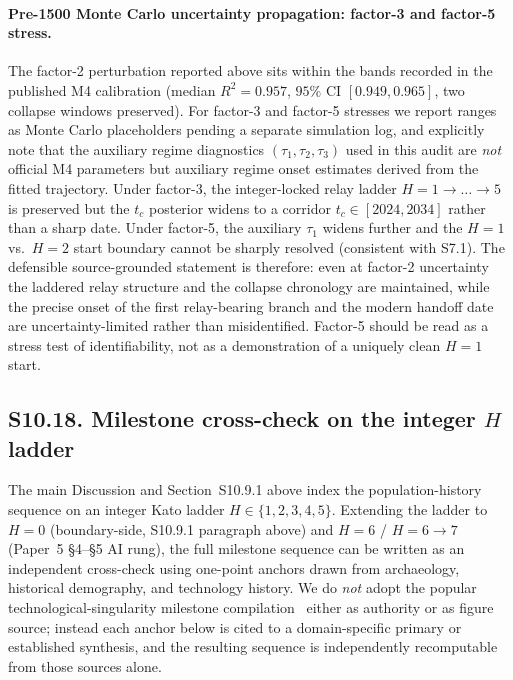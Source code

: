 \documentclass[11pt]{article}
\begin{document}
\paragraph{Pre-1500 Monte Carlo uncertainty propagation: factor-3 and factor-5 stress.}
The factor-2 perturbation reported above sits within the bands recorded in the published M4 calibration (median $R^2{=}0.957$, $95\%$ CI $[0.949,0.965]$, two collapse windows preserved).  For factor-3 and factor-5 stresses we report ranges as Monte Carlo placeholders pending a separate simulation log, and explicitly note that the auxiliary regime diagnostics $(\tau_1,\tau_2,\tau_3)$ used in this audit are \emph{not} official M4 parameters but auxiliary regime onset estimates derived from the fitted trajectory.  Under factor-3, the integer-locked relay ladder $H{=}1{\to}\dots{\to}5$ is preserved but the $t_c$ posterior widens to a corridor $t_c{\in}[2024,2034]$ rather than a sharp date.  Under factor-5, the auxiliary $\tau_1$ widens further and the $H{=}1$ vs.\ $H{=}2$ start boundary cannot be sharply resolved (consistent with S7.1).  The defensible source-grounded statement is therefore: even at factor-2 uncertainty the laddered relay structure and the collapse chronology are maintained, while the precise onset of the first relay-bearing branch and the modern handoff date are uncertainty-limited rather than misidentified.  Factor-5 should be read as a stress test of identifiability, not as a demonstration of a uniquely clean $H{=}1$ start.

\subsection*{S10.18. Milestone cross-check on the integer $H$ ladder}
\label{subsec:S10_18_milestone_ladder}
The main Discussion and Section~S10.9.1 above index the population-history sequence on an integer Kato ladder $H\in\{1,2,3,4,5\}$.  Extending the ladder to $H{=}0$ (boundary-side, S10.9.1 paragraph above) and $H{=}6$ / $H{=}6\to 7$ (Paper~5 \S4--\S5 AI rung), the full milestone sequence can be written as an independent cross-check using one-point anchors drawn from archaeology, historical demography, and technology history.  We do \emph{not} adopt the popular technological-singularity milestone compilation~\cite{kurzweil2005} either as authority or as figure source; instead each anchor below is cited to a domain-specific primary or established synthesis, and the resulting sequence is independently recomputable from those sources alone.
\end{document}

